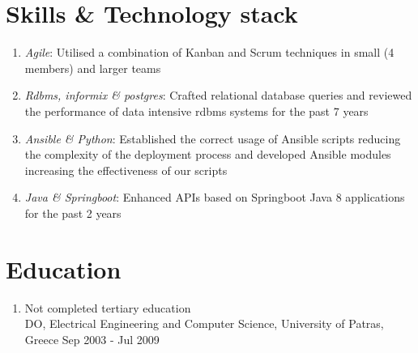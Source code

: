 \documentclass{CVSoftwareEngineer}
\begin{document}
	\section{Skills \& Technology stack}
	\begin{enumerate}[labelwidth=!, labelindent=22pt, leftmargin=*, rightmargin=15pt]
		\item[\textasteriskcentered] \textit{Agile}: Utilised a combination of Kanban and Scrum techniques in small (4 members)
			and larger teams
		\item[\textasteriskcentered] \textit{Rdbms, informix \& postgres}: Crafted relational database queries and reviewed
			the performance of data intensive rdbms systems for the past 7 years
		\item[\textasteriskcentered] \textit{Ansible \& Python}: Established the correct usage of Ansible scripts reducing the complexity
			of the deployment process and developed Ansible modules increasing the effectiveness of our scripts
		\item[\textasteriskcentered] \textit{Java \& Springboot}: Enhanced APIs based on Springboot Java 8 applications for the past 2 years
	\end{enumerate}

	\section{Education}
	\begin{enumerate}[labelwidth=!, labelindent=0pt, leftmargin=*, rightmargin=15pt]
		\item[] Not completed tertiary education \\
			DO, Electrical Engineering and Computer Science, University of Patras, Greece \hfill {\scriptsize Sep 2003 - Jul 2009}
	\end{enumerate}
\end{document}
